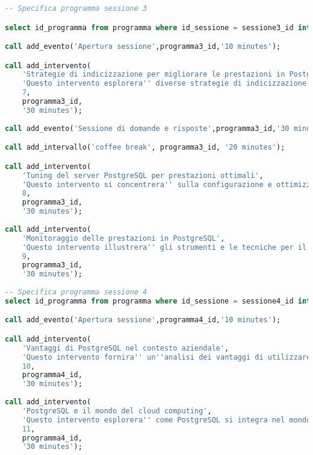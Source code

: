 \begin{lstlisting}[language=SQL, style=mystyle,caption={Conferenza PGConf NPL}]
-- Specifica programma sessione 3

select id_programma from programma where id_sessione = sessione3_id into programma3_id;

call add_evento('Apertura sessione',programma3_id,'10 minutes');

call add_intervento(
    'Strategie di indicizzazione per migliorare le prestazioni in PostgreSQL',
    'Questo intervento esplorera'' diverse strategie di indicizzazione per ottimizzare le prestazioni delle query in PostgreSQL, compreso l''utilizzo di indici multi-colonna, indici parziali e indici funzionali',
    7,
    programma3_id,
    '30 minutes');
    
call add_evento('Sessione di domande e risposte',programma3_id,'30 minutes');

call add_intervallo('coffee break', programma3_id, '20 minutes');

call add_intervento(
    'Tuning del server PostgreSQL per prestazioni ottimali',
    'Questo intervento si concentrera'' sulla configurazione e ottimizzazione del server PostgreSQL per garantire prestazioni ottimali, compreso il tuning dei parametri di configurazione e la gestione della memoria.',
    8,
    programma3_id,
    '30 minutes');
    
call add_intervento(
    'Monitoraggio delle prestazioni in PostgreSQL',
    'Questo intervento illustrera'' gli strumenti e le tecniche per il monitoraggio delle prestazioni in PostgreSQL, compresi i metodi per identificare e risolvere i colli di bottiglia e i problemi di prestazioni.',
    9,
    programma3_id,
    '30 minutes');
    
-- Specifica programma sessione 4
select id_programma from programma where id_sessione = sessione4_id into programma4_id;

call add_evento('Apertura sessione',programma4_id,'10 minutes');

call add_intervento(
    'Vantaggi di PostgreSQL nel contesto aziendale',
    'Questo intervento fornira'' un''analisi dei vantaggi di utilizzare PostgreSQL nel contesto aziendale, compresa l''affidabilita'', le prestazioni e il supporto della comunita''.',
    10,
    programma4_id,
    '30 minutes');
    
call add_intervento(
    'PostgreSQL e il mondo del cloud computing',
    'Questo intervento esplorera'' come PostgreSQL si integra nel mondo del cloud computing e come le aziende possono trarre vantaggio dall''utilizzo di PostgreSQL come database cloud-native.',
    11,
    programma4_id,
    '30 minutes');
    

\end{lstlisting}
